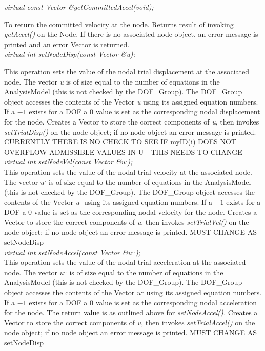 {\em virtual const Vector \&getCommittedAccel(void);} 

To return the committed velocity at the node. Returns result of
invoking  {\em getAccel()} on the Node. If there is no associated node
object, an error message is printed and an error Vector is returned. \\

{\em virtual int setNodeDisp(const Vector \&u);} 

This operation sets the value of the nodal trial displacement at the
associated node. The vector {\em u} is of size equal to the number of
equations in the AnalysisModel (this is not checked by the DOF\_Group).
The DOF\_Group object accesses the contents of the Vector {\em u} using
its assigned equation numbers. If a $-1$ exists for a DOF a $0$ value
is set as the corresponding nodal displacement for the node. Creates a Vector
to store the correct components of {\em u}, then invokes {\em setTrialDisp()}
on the node object; if no node object an error message is
printed. CURRENTLY THERE IS NO CHECK TO SEE IF myID(i) DOES NOT OVERFLOW
ADMISSIBLE VALUES IN U - THIS NEEDS TO CHANGE \\


{\em virtual int setNodeVel(const Vector \&$u^{.}$);}\\
This operation sets the value of the nodal trial velocity at the
associated node. The vector {\em $u^{.}$} is of size equal to the number of
equations in the AnalysisModel (this is not checked by the DOF\_Group).
The DOF\_Group object accesses the contents of the Vector {\em $u^{.}$} using
its assigned equation numbers. If a $-1$ exists for a DOF a $0$ value
is set as the corresponding nodal velocity for the node.  Creates a Vector
to store the correct components of {\em u}, then invokes {\em setTrialVel()}
on the node object; if no node object an error message is printed. 
MUST CHANGE AS setNodeDisp \\

{\em virtual int setNodeAccel(const Vector \&$u^{..}$);}\\
This operation sets the value of the nodal trial acceleration at the
associated node. The vector {\em $u^{..}$} is of size equal to the number of
equations in the AnalysisModel (this is not checked by the DOF\_Group).
The DOF\_Group object accesses the contents of the Vector {\em $u^{..}$} using
its assigned equation numbers. If a $-1$ exists for a DOF a $0$ value
is set as the corresponding nodal acceleration for the node. The return
value is as outlined above for {\em setNodeAccel().} Creates a Vector
to store the correct components of {\em u}, then invokes {\em setTrialAccel()}
on the node object; if no node object an error message is printed. 
MUST CHANGE AS setNodeDisp \\



